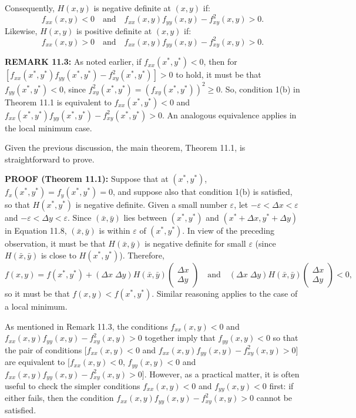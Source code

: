 \begin{original}
Consequently, $H(x, y)$ is negative definite at $(x, y)$ if:
\[
f_{xx}(x, y) < 0 \quad\text{and}\quad f_{xx}(x, y)f_{yy}(x, y) - f_{xy}^2(x, y) > 0.
\]
Likewise, $H(x, y)$ is positive definite at $(x, y)$ if:
\[
f_{xx}(x, y) > 0 \quad\text{and}\quad f_{xx}(x, y)f_{yy}(x, y) - f_{xy}^2(x, y) > 0.
\]

\textbf{REMARK 11.3:} As noted earlier, if $f_{xx}(x^*, y^*) < 0$, then for $[f_{xx}(x^*, y^*)f_{yy}(x^*, y^*) - f_{xy}^2(x^*, y^*)] > 0$ to hold, it must be that $f_{yy}(x^*, y^*) < 0$, since $f_{xy}^2(x^*, y^*) = (f_{xy}(x^*, y^*))^2 \geq 0$. So, condition 1(b) in Theorem 11.1 is equivalent to $f_{xx}(x^*, y^*) < 0$ and $f_{xx}(x^*, y^*)f_{yy}(x^*, y^*) - f_{xy}^2(x^*, y^*) > 0$. An analogous equivalence applies in the local minimum case.

Given the previous discussion, the main theorem, Theorem 11.1, is straightforward to prove.

\textbf{PROOF (Theorem 11.1):} Suppose that at $(x^*, y^*)$, $f_x(x^*, y^*) = f_y(x^*, y^*) = 0$, and suppose also that condition 1(b) is satisfied, so that $H(x^*, y^*)$ is negative definite. Given a small number $\varepsilon$, let $-\varepsilon < \Delta x < \varepsilon$ and $-\varepsilon < \Delta y < \varepsilon$. Since $(\bar{x}, \bar{y})$ lies between $(x^*, y^*)$ and $(x^* + \Delta x, y^* + \Delta y)$ in Equation 11.8, $(\bar{x}, \bar{y})$ is within $\varepsilon$ of $(x^*, y^*)$. In view of the preceding observation, it must be that $H(\bar{x}, \bar{y})$ is negative definite for small $\varepsilon$ (since $H(\bar{x}, \bar{y})$ is close to $H(x^*, y^*)$). Therefore,
\[
f(x, y) = f(x^*, y^*) + (\Delta x\; \Delta y) H(\bar{x}, \bar{y}) \begin{pmatrix} \Delta x \\ \Delta y \end{pmatrix} \quad\text{and}\quad (\Delta x\; \Delta y) H(\bar{x}, \bar{y}) \begin{pmatrix} \Delta x \\ \Delta y \end{pmatrix} < 0,
\]
so it must be that $f(x, y) < f(x^*, y^*)$. Similar reasoning applies to the case of a local minimum.

As mentioned in Remark 11.3, the conditions $f_{xx}(x, y) < 0$ and $f_{xx}(x, y)f_{yy}(x, y) - f_{xy}^2(x, y) > 0$ together imply that $f_{yy}(x, y) < 0$ so that the pair of conditions $[f_{xx}(x, y) < 0$ and $f_{xx}(x, y)f_{yy}(x, y) - f_{xy}^2(x, y) > 0]$ are equivalent to $[f_{xx}(x, y) < 0$, $f_{yy}(x, y) < 0$ and $f_{xx}(x, y)f_{yy}(x, y) - f_{xy}^2(x, y) > 0]$. However, as a practical matter, it is often useful to check the simpler conditions $f_{xx}(x, y) < 0$ and $f_{yy}(x, y) < 0$ first: if either fails, then the condition $f_{xx}(x, y)f_{yy}(x, y) - f_{xy}^2(x, y) > 0$ cannot be satisfied.
\end{original}
